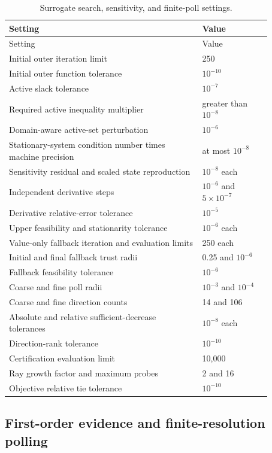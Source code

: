 \begin{longtable}{p{0.64\linewidth}p{0.23\linewidth}}
\caption{Surrogate search, sensitivity, and finite-poll settings.}\label{tab:plant_surrogate_search_settings}\\
\toprule Setting & Value\\\midrule\endfirsthead
\toprule Setting & Value\\\midrule\endhead
Initial outer iteration limit & 250\\
Initial outer function tolerance & $10^{-10}$\\
Active slack tolerance & $10^{-7}$\\
Required active inequality multiplier & greater than $10^{-8}$\\
Domain-aware active-set perturbation & $10^{-6}$\\
Stationary-system condition number times machine precision & at most $10^{-8}$\\
Sensitivity residual and scaled state reproduction & $10^{-8}$ each\\
Independent derivative steps & $10^{-6}$ and $5\times10^{-7}$\\
Derivative relative-error tolerance & $10^{-5}$\\
Upper feasibility and stationarity tolerance & $10^{-6}$ each\\
Value-only fallback iteration and evaluation limits & 250 each\\
Initial and final fallback trust radii & 0.25 and $10^{-6}$\\
Fallback feasibility tolerance & $10^{-6}$\\
Coarse and fine poll radii & $10^{-3}$ and $10^{-4}$\\
Coarse and fine direction counts & 14 and 106\\
Absolute and relative sufficient-decrease tolerances & $10^{-8}$ each\\
Direction-rank tolerance & $10^{-10}$\\
Certification evaluation limit & 10{,}000\\
Ray growth factor and maximum probes & 2 and 16\\
Objective relative tie tolerance & $10^{-10}$\\
\bottomrule
\end{longtable}

\subsection{First-order evidence and finite-resolution polling}

